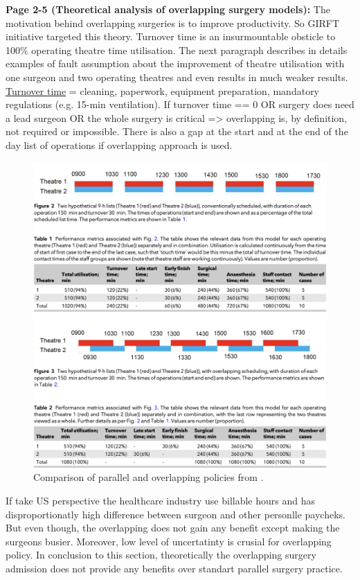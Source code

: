     \textbf{Page 2-5 (Theoretical analysis of overlapping surgery models):}
    The motivation behind overlapping surgeries is to improve productivity. So GIRFT initiative targeted this theory. Turnover time is an insurmountable obsticle to 100\% operating theatre time utilisation. The next paragraph describes in details examples of fault assumption about the improvement of theatre utilisation with one surgeon and two operating theatres and even results in much weaker results.
    \underline{Turnover time} = cleaning, paperwork, equipment preparation, mandatory regulations (e.g. 15-min ventilation). If turnover time == 0 OR surgery does need a lead surgeon OR the whole surgery is critical => overlapping is, by definition, not required or impossible. There is also a gap at the start and at the end of the day list of operations if overlapping approach is used.
    \begin{figure}[H]
        \centering
        \includegraphics[width=1\textwidth]{figures/SR0019GB22/fig1.png}
        \caption{Comparison of parallel and overlapping policies from \cite{x333}.}
        \label{fig1:SR0019GB22}
    \end{figure}
    If take US perspective the healthcare industry use billable hours and has disproportionatly high difference between surgeon and other personlle paycheks. But even though, the overlapping does not gain any benefit except making the surgeons busier. Moreover, low level of uncertatinty is crusial for overlapping policy. In conclusion to this section, theoretically the overlapping surgery admission does not provide any benefits over standart parallel surgery practice.

